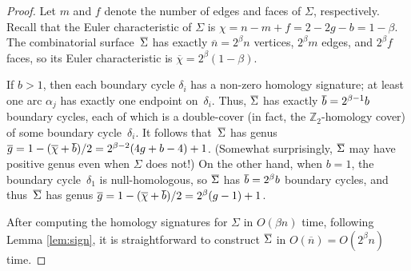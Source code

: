\documentclass[letterpaper,review]{siamart190516}
\def\Z{\mathbb{Z}}
\def\dualarc{\alpha}
\def\Sigmabar{\overline{\smash{\Sigma}\vphantom{t}}}
\def\bbar{\overline{\smash{b}\vphantom{t}}}
\def\nbar{\overline{n}}
\def\gbar{\overline{g}}
\def\chibar{\overline{\chi}}
\begin{document}
\begin{proof}
Let $m$ and $f$ denote the number of edges and faces of $\Sigma$, respectively.  Recall that the Euler characteristic of $\Sigma$ is $\chi = n - m + f = 2 - 2g - b = 1-\beta$.  The combinatorial surface~$\Sigmabar$ has exactly $\nbar = 2^\beta n$ vertices, $2^\beta m$ edges, and $2^\beta f$ faces, so its Euler characteristic is $\chibar = 2^\beta (1-\beta)$.

If $b>1$, then each boundary cycle $\delta_i$ has a non-zero homology signature; at least one arc $\dualarc_j$ has exactly one endpoint on~$\delta_i$.  Thus, $\Sigmabar$ has exactly $\bbar = 2^{\beta-1} b$ boundary cycles, each of which is a double-cover (in fact, the $\Z_2$-homology cover) of some boundary cycle~$\delta_i$.  It follows that~$\Sigmabar$ has genus $\gbar = 1-(\chibar+\bbar)/2 = {2^{\beta-2} ({4g+b-4}) + 1}$.  (Somewhat surprisingly, $\Sigmabar$ may have positive genus even when $\Sigma$ does not!)  On the other hand, when $b=1$, the boundary cycle~$\delta_1$ is null-homologous, so $\Sigmabar$ has $\bbar = 2^\beta b$ boundary cycles, and thus~$\Sigmabar$ has genus $\gbar = {1-(\chibar+\bbar)/2} =  {2^\beta (g-1) + 1}$.

After computing the homology signatures for $\Sigma$ in $O(\beta n)$ time, following Lemma \ref{lem:sign}, it is straightforward to construct $\Sigmabar$ in $O(\nbar) = O(2^\beta n)$ time.
\end{proof}
\end{document}
